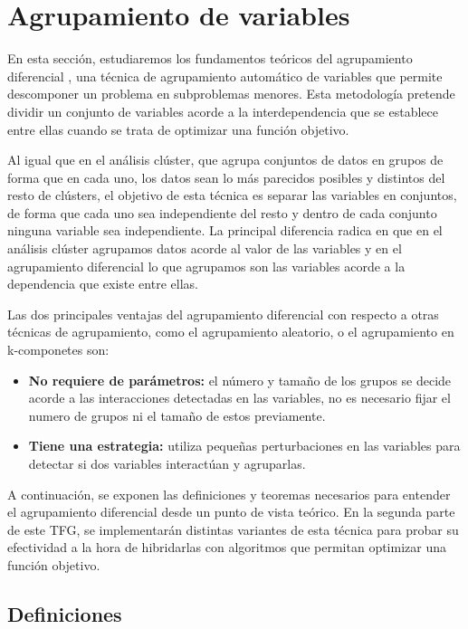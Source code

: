 
\chapter{Agrupamiento de variables}

En esta sección, estudiaremos los fundamentos teóricos del agrupamiento diferencial \cite{DG2} \cite{RDG} \cite{DG} \cite{ERDG} , una técnica de agrupamiento automático de variables que permite descomponer un problema en subproblemas menores. Esta metodología pretende dividir un conjunto de variables acorde a la interdependencia que se establece entre ellas cuando se trata de optimizar una función objetivo.

Al igual que en el análisis clúster, que agrupa conjuntos de datos en grupos de forma que en cada uno, los datos sean lo más parecidos posibles y distintos del resto de clústers, el objetivo de esta técnica es separar las variables en conjuntos, de forma que cada uno sea independiente del resto y dentro de cada conjunto ninguna variable sea independiente. La principal diferencia radica en que en el análisis clúster agrupamos datos acorde al valor de las variables y en el agrupamiento diferencial lo que agrupamos son las variables acorde a la dependencia que existe entre ellas.

Las dos principales ventajas del agrupamiento diferencial con respecto a otras técnicas de agrupamiento, como el agrupamiento aleatorio, o el agrupamiento en k-componetes son:
\begin{itemize}
	\item \textbf{No requiere de parámetros:} el número y tamaño de los grupos se decide acorde a las interacciones detectadas en las variables, no es necesario fijar el numero de grupos ni el tamaño de estos previamente.
	\item \textbf{Tiene una estrategia:} utiliza pequeñas perturbaciones en las variables para detectar si dos variables interactúan y agruparlas.
\end{itemize}

A continuación, se exponen las definiciones y teoremas necesarios para entender el agrupamiento diferencial desde un punto de vista teórico. En la segunda parte de este TFG, se implementarán distintas variantes de esta técnica para probar su efectividad a la hora de hibridarlas con algoritmos que permitan optimizar una función objetivo.

\section{Definiciones}

